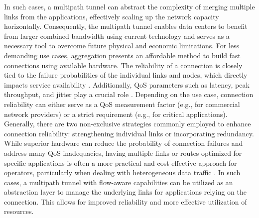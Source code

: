 In such cases, a multipath tunnel can abstract the complexity of merging multiple links from the applications, effectively scaling up the network capacity horizontally. 
Consequently, the multipath tunnel enables data centers to benefit from larger combined bandwidth using current technology and serves as a necessary tool to overcome future physical and economic limitations.
For less demanding use cases, aggregation presents an affordable method to build fast connections using available hardware.
%
The reliability of a connection is closely tied to the failure probabilities of the individual links and nodes, which directly impacts service availability \cite{shooman_algorithms_1995}. 
Additionally, \ac{QoS} parameters such as latency, peak throughput, and jitter play a crucial role \cite{gozdecki_quality_2003}.
Depending on the use case, connection reliability can either serve as a \ac{QoS} measurement factor (e.g., for commercial network providers) or a strict requirement (e.g., for critical applications). 
Generally, there are two non-exclusive strategies commonly employed to enhance connection reliability: strengthening individual links or incorporating redundancy.
While superior hardware can reduce the probability of connection failures and address many \ac{QoS} inadequacies, having multiple links or routes optimized for specific applications is often a more practical and cost-effective approach for operators, particularly when dealing with heterogeneous data traffic \cite{chen_overview_1998}.
In such cases, a multipath tunnel with flow-aware capabilities can be utilized as an abstraction layer to manage the underlying links for applications relying on the connection. 
This allows for improved reliability and more effective utilization of resources. 
 

